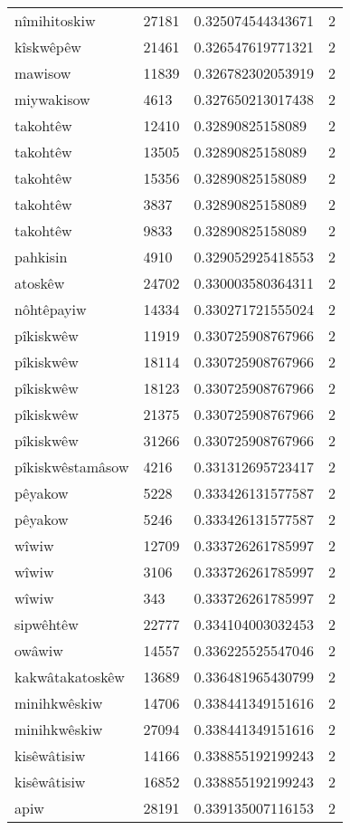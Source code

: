 \begin{longtable}{llll}
nîmihitoskiw & 27181 & 0.325074544343671 & 2 \\
kîskwêpêw & 21461 & 0.326547619771321 & 2 \\
mawisow & 11839 & 0.326782302053919 & 2 \\
miywakisow & 4613 & 0.327650213017438 & 2 \\
takohtêw & 12410 & 0.32890825158089 & 2 \\
takohtêw & 13505 & 0.32890825158089 & 2 \\
takohtêw & 15356 & 0.32890825158089 & 2 \\
takohtêw & 3837 & 0.32890825158089 & 2 \\
takohtêw & 9833 & 0.32890825158089 & 2 \\
pahkisin & 4910 & 0.329052925418553 & 2 \\
atoskêw & 24702 & 0.330003580364311 & 2 \\
nôhtêpayiw & 14334 & 0.330271721555024 & 2 \\
pîkiskwêw & 11919 & 0.330725908767966 & 2 \\
pîkiskwêw & 18114 & 0.330725908767966 & 2 \\
pîkiskwêw & 18123 & 0.330725908767966 & 2 \\
pîkiskwêw & 21375 & 0.330725908767966 & 2 \\
pîkiskwêw & 31266 & 0.330725908767966 & 2 \\
pîkiskwêstamâsow & 4216 & 0.331312695723417 & 2 \\
pêyakow & 5228 & 0.333426131577587 & 2 \\
pêyakow & 5246 & 0.333426131577587 & 2 \\
wîwiw & 12709 & 0.333726261785997 & 2 \\
wîwiw & 3106 & 0.333726261785997 & 2 \\
wîwiw & 343 & 0.333726261785997 & 2 \\
sipwêhtêw & 22777 & 0.334104003032453 & 2 \\
owâwiw & 14557 & 0.336225525547046 & 2 \\
kakwâtakatoskêw & 13689 & 0.336481965430799 & 2 \\
minihkwêskiw & 14706 & 0.338441349151616 & 2 \\
minihkwêskiw & 27094 & 0.338441349151616 & 2 \\
kisêwâtisiw & 14166 & 0.338855192199243 & 2 \\
kisêwâtisiw & 16852 & 0.338855192199243 & 2 \\
apiw & 28191 & 0.339135007116153 & 2 \\

\end{longtable}
